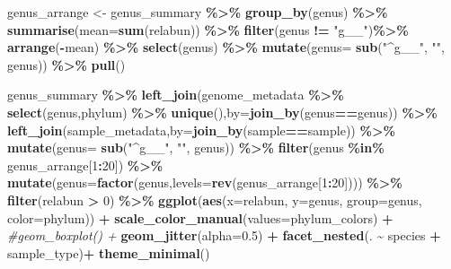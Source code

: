 \documentclass[
]{book}
\newenvironment{Shaded}{\begin{snugshade}}{\end{snugshade}}
\newcommand{\AttributeTok}[1]{\textcolor[rgb]{0.13,0.29,0.53}{#1}}
\newcommand{\CommentTok}[1]{\textcolor[rgb]{0.56,0.35,0.01}{\textit{#1}}}
\newcommand{\DecValTok}[1]{\textcolor[rgb]{0.00,0.00,0.81}{#1}}
\newcommand{\FloatTok}[1]{\textcolor[rgb]{0.00,0.00,0.81}{#1}}
\newcommand{\FunctionTok}[1]{\textcolor[rgb]{0.13,0.29,0.53}{\textbf{#1}}}
\newcommand{\NormalTok}[1]{#1}
\newcommand{\OtherTok}[1]{\textcolor[rgb]{0.56,0.35,0.01}{#1}}
\newcommand{\SpecialCharTok}[1]{\textcolor[rgb]{0.81,0.36,0.00}{\textbf{#1}}}
\newcommand{\StringTok}[1]{\textcolor[rgb]{0.31,0.60,0.02}{#1}}
\begin{document}
\begin{Shaded}
\begin{Highlighting}[]
\NormalTok{genus\_arrange }\OtherTok{\textless{}{-}}\NormalTok{ genus\_summary }\SpecialCharTok{\%\textgreater{}\%}
    \FunctionTok{group\_by}\NormalTok{(genus) }\SpecialCharTok{\%\textgreater{}\%}
    \FunctionTok{summarise}\NormalTok{(}\AttributeTok{mean=}\FunctionTok{sum}\NormalTok{(relabun)) }\SpecialCharTok{\%\textgreater{}\%}
    \FunctionTok{filter}\NormalTok{(genus }\SpecialCharTok{!=} \StringTok{"g\_\_"}\NormalTok{)}\SpecialCharTok{\%\textgreater{}\%}
    \FunctionTok{arrange}\NormalTok{(}\SpecialCharTok{{-}}\NormalTok{mean) }\SpecialCharTok{\%\textgreater{}\%}
    \FunctionTok{select}\NormalTok{(genus) }\SpecialCharTok{\%\textgreater{}\%}
    \FunctionTok{mutate}\NormalTok{(}\AttributeTok{genus=} \FunctionTok{sub}\NormalTok{(}\StringTok{"\^{}g\_\_"}\NormalTok{, }\StringTok{""}\NormalTok{, genus)) }\SpecialCharTok{\%\textgreater{}\%}
    \FunctionTok{pull}\NormalTok{()}

\NormalTok{genus\_summary }\SpecialCharTok{\%\textgreater{}\%}
    \FunctionTok{left\_join}\NormalTok{(genome\_metadata }\SpecialCharTok{\%\textgreater{}\%} \FunctionTok{select}\NormalTok{(genus,phylum) }\SpecialCharTok{\%\textgreater{}\%} \FunctionTok{unique}\NormalTok{(),}\AttributeTok{by=}\FunctionTok{join\_by}\NormalTok{(genus}\SpecialCharTok{==}\NormalTok{genus)) }\SpecialCharTok{\%\textgreater{}\%}
    \FunctionTok{left\_join}\NormalTok{(sample\_metadata,}\AttributeTok{by=}\FunctionTok{join\_by}\NormalTok{(sample}\SpecialCharTok{==}\NormalTok{sample)) }\SpecialCharTok{\%\textgreater{}\%}
    \FunctionTok{mutate}\NormalTok{(}\AttributeTok{genus=} \FunctionTok{sub}\NormalTok{(}\StringTok{"\^{}g\_\_"}\NormalTok{, }\StringTok{""}\NormalTok{, genus)) }\SpecialCharTok{\%\textgreater{}\%}
    \FunctionTok{filter}\NormalTok{(genus }\SpecialCharTok{\%in\%}\NormalTok{ genus\_arrange[}\DecValTok{1}\SpecialCharTok{:}\DecValTok{20}\NormalTok{]) }\SpecialCharTok{\%\textgreater{}\%}
    \FunctionTok{mutate}\NormalTok{(}\AttributeTok{genus=}\FunctionTok{factor}\NormalTok{(genus,}\AttributeTok{levels=}\FunctionTok{rev}\NormalTok{(genus\_arrange[}\DecValTok{1}\SpecialCharTok{:}\DecValTok{20}\NormalTok{]))) }\SpecialCharTok{\%\textgreater{}\%}
    \FunctionTok{filter}\NormalTok{(relabun }\SpecialCharTok{\textgreater{}} \DecValTok{0}\NormalTok{) }\SpecialCharTok{\%\textgreater{}\%}
    \FunctionTok{ggplot}\NormalTok{(}\FunctionTok{aes}\NormalTok{(}\AttributeTok{x=}\NormalTok{relabun, }\AttributeTok{y=}\NormalTok{genus, }\AttributeTok{group=}\NormalTok{genus, }\AttributeTok{color=}\NormalTok{phylum)) }\SpecialCharTok{+}
        \FunctionTok{scale\_color\_manual}\NormalTok{(}\AttributeTok{values=}\NormalTok{phylum\_colors) }\SpecialCharTok{+}
        \CommentTok{\#geom\_boxplot() +}
        \FunctionTok{geom\_jitter}\NormalTok{(}\AttributeTok{alpha=}\FloatTok{0.5}\NormalTok{) }\SpecialCharTok{+} 
        \FunctionTok{facet\_nested}\NormalTok{(. }\SpecialCharTok{\textasciitilde{}}\NormalTok{ species }\SpecialCharTok{+}\NormalTok{ sample\_type)}\SpecialCharTok{+}
        \FunctionTok{theme\_minimal}\NormalTok{()}
\end{Highlighting}
\end{Shaded}
\end{document}
